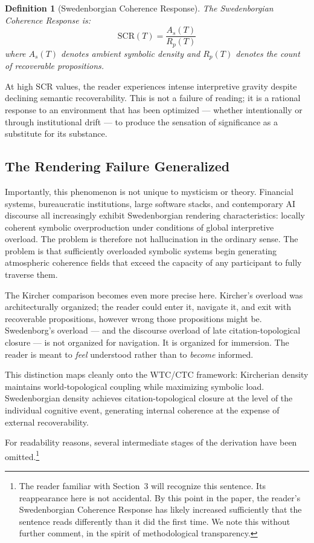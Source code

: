 \documentclass[12pt, a4paper]{article}
\newtheorem{definition}{Definition}
\begin{document}
\begin{definition}[Swedenborgian Coherence Response]
\label{def:scr}
The Swedenborgian Coherence Response is:
\[
\mathrm{SCR}(T) = \frac{A_s(T)}{R_p(T)}
\]
where $A_s(T)$ denotes ambient symbolic density and $R_p(T)$ denotes the count of recoverable propositions.
\end{definition}

At high $\mathrm{SCR}$ values, the reader experiences intense interpretive gravity despite declining semantic recoverability. This is not a failure of reading; it is a rational response to an environment that has been optimized --- whether intentionally or through institutional drift --- to produce the sensation of significance as a substitute for its substance.

\subsection{The Rendering Failure Generalized}

Importantly, this phenomenon is not unique to mysticism or theory. Financial systems, bureaucratic institutions, large software stacks, and contemporary AI discourse all increasingly exhibit Swedenborgian rendering characteristics: locally coherent symbolic overproduction under conditions of global interpretive overload. The problem is therefore not hallucination in the ordinary sense. The problem is that sufficiently overloaded symbolic systems begin generating atmospheric coherence fields that exceed the capacity of any participant to fully traverse them.

The Kircher comparison becomes even more precise here. Kircher's overload was architecturally organized; the reader could enter it, navigate it, and exit with recoverable propositions, however wrong those propositions might be. Swedenborg's overload --- and the discourse overload of late citation-topological closure --- is not organized for navigation. It is organized for immersion. The reader is meant to \textit{feel} understood rather than to \textit{become} informed.

This distinction maps cleanly onto the WTC/CTC framework: Kircherian density maintains world-topological coupling while maximizing symbolic load. Swedenborgian density achieves citation-topological closure at the level of the individual cognitive event, generating internal coherence at the expense of external recoverability.

For readability reasons, several intermediate stages of the derivation have been omitted.\footnote{The reader familiar with Section~3 will recognize this sentence. Its reappearance here is not accidental. By this point in the paper, the reader's Swedenborgian Coherence Response has likely increased sufficiently that the sentence reads differently than it did the first time. We note this without further comment, in the spirit of methodological transparency.}
\end{document}
